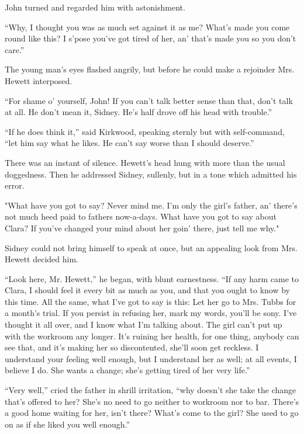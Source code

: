 {\protect\hypertarget{55}{}{}}John turned and regarded him with
astonishment.

``Why, I thought you was as much set against it as me? What's made you
come round like this? I s'pose you've got tired of her, an' that's made
you so you don't care.''

The young man's eyes flashed angrily, but before he could make a
rejoinder Mrs. Hewett interposed.

``For shame o' yourself, John! If you can't talk better sense than that,
don't talk at all. He don't mean it, Sidney. He's half drove off his
head with trouble.''

``If he does think it,'' said Kirkwood, speaking sternly but with
self-command, ``let him say what he likes. He can't say worse than I
should deserve.''

There was an instant of silence. Hewett's head hung with more than the
usual doggedness. Then he addressed Sidney, sullenly, but in a tone
which admitted his error.

"What have you got to say? Never mind me. I'm only the girl's father,
an' there's not {\protect\hypertarget{56}{}{}}much heed paid to fathers
now-a-days. What have you got to say about Clara? If you've changed your
mind about her goin' there, just tell me why."

Sidney could not bring himself to speak at once, but an appealing look
from Mrs. Hewett decided him.

``Look here, Mr. Hewett,'' he began, with blunt earnestness. ``If any
harm came to Clara, I should feel it every bit as much as you, and that
you ought to know by this time. All the same, what I've got to say is
this: Let her go to Mrs. Tubbs for a month's trial. If you persist in
refusing her, mark my words, you'll be sony. I've thought it all over,
and I know what I'm talking about. The girl can't put up with the
workroom any longer. It's ruining her health, for one thing, anybody can
see that, and it's making her so discontented, she'll soon get reckless.
I understand your feeling well enough, but I understand her as well; at
all events, I believe I do. She wants a change; she's getting tired of
her very life.''

{\protect\hypertarget{57}{}{}}``Very well,'' cried the father in shrill
irritation, ``why doesn't she take the change that's offered to her?
She's no need to go neither to workroom nor to bar. There's a good home
waiting for her, isn't there? What's come to the girl? She used to go on
as if she liked you well enough.''

